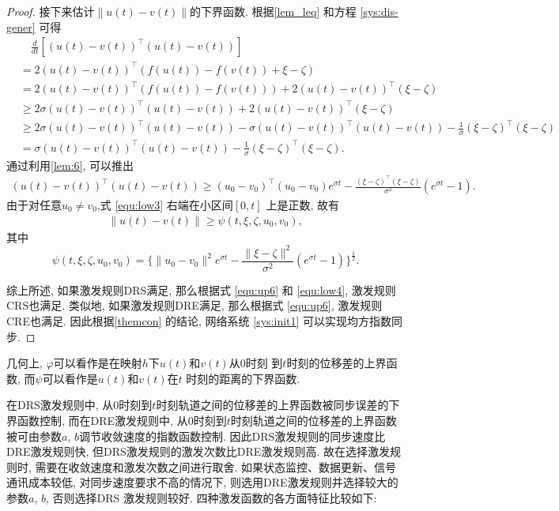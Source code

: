 \begin{proof}
        接下来估计$\| u(t)-v(t)\|$的下界函数. 根据\autoref{lem_leq} 和方程 \eqref{sys:dis-gener} 可得
            \begin{align}\label{equ:low1}
            \nonumber &\quad\frac{d}{dt}[(u(t)-v(t))^\top(u(t)-v(t))]\\
            \nonumber &=2(u(t)-v(t))^\top(f(u(t))-f(v(t))+\xi-\zeta)\\
            \nonumber &=2(u(t)-v(t))^\top(f(u(t))-f(v(t)))+2(u(t)-v(t))^\top(\xi-\zeta)\\
            \nonumber &\geq 2\sigma(u(t)-v(t))^\top(u(t)-v(t))+2(u(t)-v(t))^\top(\xi-\zeta)\\
            \nonumber &\geq 2\sigma(u(t)-v(t))^\top(u(t)-v(t))-\sigma(u(t)-v(t))^\top(u(t)-v(t))-\frac{1}{\sigma}(\xi-\zeta)^\top(\xi-\zeta)\\
            &=\sigma(u(t)-v(t))^\top(u(t)-v(t))-\frac{1}{\sigma}(\xi-\zeta)^\top(\xi-\zeta).
            \end{align}
        通过利用\autoref{lem:6}, 可以推出
        \begin{align}\label{equ:low3}
        (u(t)-v(t))^\top(u(t)-v(t))\geq (u_0-v_0)^\top(u_0-v_0)e^{\sigma t}-\frac{(\xi-\zeta)^\top(\xi-\zeta)}{\sigma^2}(e^{\sigma t}-1).
        \end{align}
        由于对任意$u_0\neq v_0$,式 \eqref{equ:low3} 右端在小区间$[0, t]$ 上是正数, 故有
        \begin{align}\label{equ:low4}
        \| u(t)-v(t)\|\geq \psi(t,\xi,\zeta,u_0,v_0),
        \end{align}
        其中
        $$\psi(t,\xi,\zeta,u_0,v_0)=\Big\{\| u_0-v_0\|^2 e^{\sigma t}-\frac{\|\xi-\zeta\|^2}{\sigma^2}(e^{\sigma t}-1)\Big\}^\frac{1}{2}.$$

        综上所述, 如果激发规则DRS满足, 那么根据式 \eqref{equ:up6} 和 \eqref{equ:low4}, 激发规则CRS也满足. 类似地, 如果激发规则DRE满足, 那么根据式 \eqref{equ:up6}, 激发规则CRE也满足. 因此根据\autoref{themcon} 的结论, 网络系统 \eqref{sys:init1} 可以实现均方指数同步.
        \end{proof}
        \begin{rem}
        几何上, $\varphi$可以看作是在映射$h$下$u(t)$和$v(t)$从$0$时刻 到$t$时刻的位移差的上界函数, 而$\psi$可以看作是$u(t)$和$v(t)$在$t$ 时刻的距离的下界函数.
        \end{rem}
        \begin{rem}
        在DRS激发规则中, 从$0$时刻到$t$时刻轨道之间的位移差的上界函数被同步误差的下界函数控制, 而在DRE激发规则中, 从$0$时刻到$t$时刻轨道之间的位移差的上界函数被可由参数$a$, $b$调节收敛速度的指数函数控制. 因此DRS激发规则的同步速度比DRE激发规则快, 但DRS激发规则的激发次数比DRE激发规则高. 故在选择激发规则时, 需要在收敛速度和激发次数之间进行取舍. 如果状态监控、数据更新、信号通讯成本较低, 对同步速度要求不高的情况下, 则选用DRE激发规则并选择较大的参数$a$, $b$, 否则选择DRS 激发规则较好.
        四种激发函数的各方面特征比较如下:
        \end{rem}
